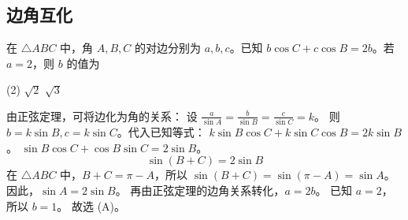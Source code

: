 








\subsection{边角互化}
\begin{example}
    在 $\triangle ABC$ 中，角 $A,B,C$ 的对边分别为 $a,b,c$。已知 $b\cos C + c\cos B = 2b$。若 $a=2$，则 $b$ 的值为
    \begin{tasks}(2)
        \task $\sqrt{2}$
        \task $\sqrt{3}$
    \end{tasks}
\end{example}
\begin{solution}
    由正弦定理，可将边化为角的关系：
    设 $\frac{a}{\sin A} = \frac{b}{\sin B} = \frac{c}{\sin C} = k$。
    则 $b=k\sin B, c=k\sin C$。代入已知等式：
    $k\sin B \cos C + k\sin C \cos B = 2k\sin B$。
    $\sin B \cos C + \cos B \sin C = 2\sin B$。
    $$
        \sin(B+C) = 2\sin B
    $$
    在 $\triangle ABC$ 中，$B+C = \pi - A$，所以 $\sin(B+C) = \sin(\pi - A) = \sin A$。
    因此，$\sin A = 2\sin B$。
    再由正弦定理的边角关系转化，$a = 2b$。
    已知 $a=2$，所以 $b=1$。
    故选 (A)。
\end{solution}

